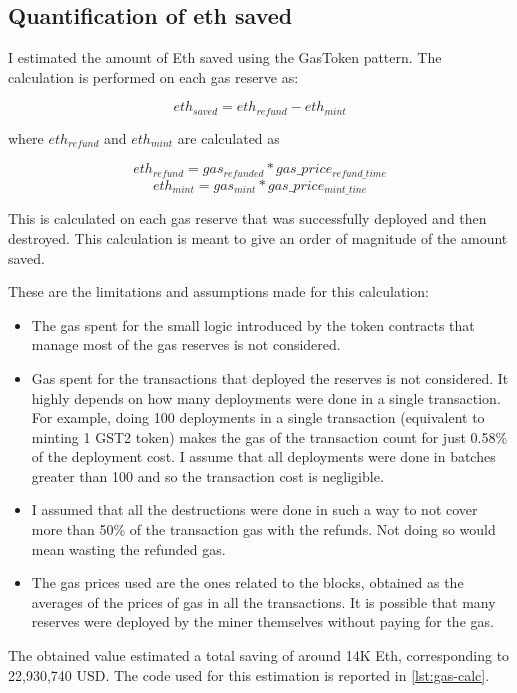\subsection{Quantification of eth saved}

I estimated the amount of Eth saved using the GasToken pattern. The calculation is performed on each gas reserve as:

\[eth_{saved}=eth_{refund}-eth_{mint}\]

\noindent where $eth_{refund}$ and $eth_{mint}$ are calculated as

\[eth_{refund} = gas_{refunded}*gas\_price_{refund\_ time}\]
\[eth_{mint}=gas_{mint}*gas\_price_{mint\_tine}\]

This is calculated on each gas reserve that was successfully deployed and then destroyed. This calculation is meant to give an order of magnitude of the amount saved.

These are the limitations and assumptions made for this calculation:

\begin{itemize}

    \item The gas spent for the small logic introduced by the token contracts that manage most of the gas reserves is not considered.
    
    \item Gas spent for the transactions that deployed the reserves is not considered. It highly depends on how many deployments were done in a single transaction. For example, doing 100 deployments in a single transaction (equivalent to minting 1 GST2 token) makes the gas of the transaction count for just 0.58\% of the deployment cost. I assume that all deployments were done in batches greater than 100 and so the transaction cost is negligible.

    \item I assumed that all the destructions were done in such a way to not cover more than 50\% of the transaction gas with the refunds. Not doing so would mean wasting the refunded gas. 

    \item The gas prices used are the ones related to the blocks, obtained as the averages of the prices of gas in all the transactions. It is possible that many reserves were deployed by the miner themselves without paying for the gas.
    
\end{itemize}

The obtained value estimated a total saving of around 14K Eth, corresponding to 22,930,740 USD. The code used for this estimation is reported in \cref{lst:gas-calc}.

